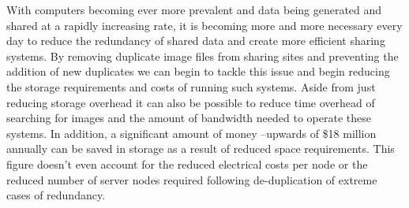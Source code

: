 \documentclass[11pt]{article}
\begin{document}
With computers becoming ever more prevalent and data being generated and shared at a rapidly increasing rate, it is becoming more and more necessary every day to reduce the redundancy of shared data and create more efficient sharing systems. By removing duplicate image files from sharing sites and preventing the addition of new duplicates we can begin to tackle this issue and begin reducing the storage requirements and costs of running such systems. Aside from just reducing storage overhead it can also be possible to reduce time overhead of searching for images and the amount of bandwidth needed to operate these systems. In addition, a significant amount of money --upwards of \$18 million annually can be saved in storage as a result of reduced space requirements. This figure doesn't even account for the reduced electrical costs per node or the reduced number of server nodes required following de-duplication of extreme cases of redundancy.

\newpage
\nocite{*}


\end{document}
